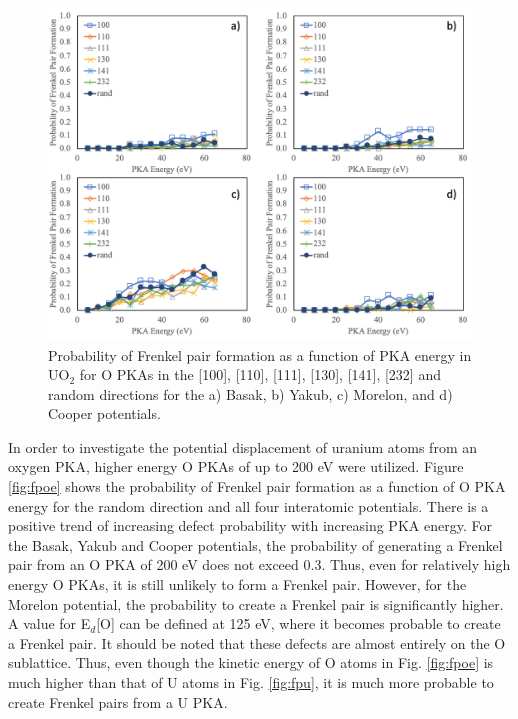 \documentclass[review]{elsarticle}
\begin{document}
\begin{figure}[h]
 \centering
 \includegraphics[width=1.0\textwidth]{FP_O.png}
 \caption{Probability of Frenkel pair formation as a function of PKA energy in UO$_2$ for O PKAs in the [100], [110], [111], [130], [141], [232] and random directions for the a) Basak, b) Yakub, c) Morelon, and d) Cooper potentials. }
 \label{fig:fpo}
\end{figure}

\FloatBarrier

In order to investigate the potential displacement of uranium atoms from an oxygen PKA, higher energy O PKAs of up to 200 eV were utilized. Figure \ref{fig:fpoe} shows the probability of Frenkel pair formation as a function of O PKA energy for the random direction and all four interatomic potentials. There is a positive trend of increasing defect probability with increasing PKA energy. For the Basak, Yakub and Cooper potentials, the probability of generating a Frenkel pair from an O PKA of 200 eV does not exceed 0.3. Thus, even for relatively high energy O PKAs, it is still unlikely to form a Frenkel pair. However, for the Morelon potential, the probability to create a Frenkel pair is significantly higher. A value for E$_d$[O] can be defined at 125 eV, where it becomes probable to create a Frenkel pair. It should be noted that these defects are almost entirely on the O sublattice. Thus, even though the kinetic energy of O atoms in Fig. \ref{fig:fpoe} is much higher than that of U atoms in Fig. \ref{fig:fpu}, it is much more probable to create Frenkel pairs from a U PKA.
\end{document}
